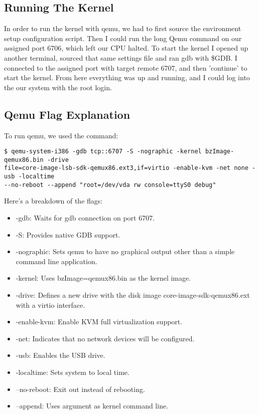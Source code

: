 \documentclass[letterpaper, 10pt, notitlepage]{article}
\begin{document}
\subsection{Running The Kernel}
In order to run the kernel with qemu, we had to first source the environment setup configuration script. Then I could run the long Qemu command on our assigned port 6706, which left our CPU halted. To start the kernel I opened up another terminal, sourced that same settings file and ran gdb with \$GDB. I connected to the assigned port with target remote 6707, and then 'continue' to start the kernel. From here everything was up and running, and I could log into the our system with the root login.

\subsection{Qemu Flag Explanation}
To run qemu, we used the command:
\begin{lstlisting}
$ qemu-system-i386 -gdb tcp::6707 -S -nographic -kernel bzImage-qemux86.bin -drive 
file=core-image-lsb-sdk-qemux86.ext3,if=virtio -enable-kvm -net none -usb -localtime 
--no-reboot --append "root=/dev/vda rw console=ttyS0 debug" 
\end{lstlisting}
Here's a breakdown of the flags: 
\begin{itemize}
	\item -gdb: Waits for gdb connection on port 6707.
    \item -S: Provides native GDB support.
    \item -nographic: Sets qemu to have no graphical output other than a simple command line application.
    \item -kernel: Uses bzImage=qemux86.bin as the kernel image.
    \item -drive: Defines a new drive with the disk image core-image-sdk-qemux86.ext with a virtio interface.
    \item -enable-kvm: Enable KVM full virtualization support.
    \item -net: Indicates that no network devices will be configured. 
    \item -usb: Enables the USB drive.
    \item -localtime: Sets system to local time.
    \item --no-reboot:  Exit out instead of rebooting.
    \item --append: Uses argument as kernel command line.
\end{itemize}
\end{document}

